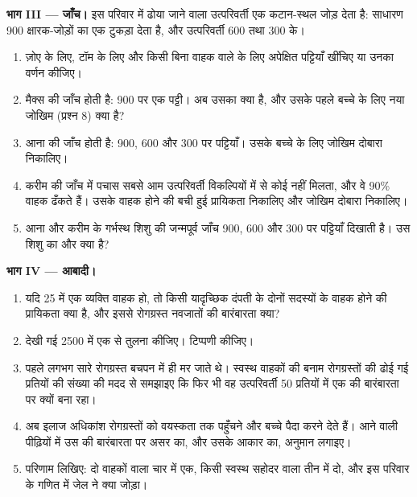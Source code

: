 \begin{problem}
\medskip
\noindent\textbf{भाग III --- जाँच।}
इस परिवार में ढोया जाने वाला उत्परिवर्ती  एक कटान-स्थल जोड़ देता है:
साधारण  900 क्षारक-जोड़ों का एक टुकड़ा देता है, और उत्परिवर्ती 600
तथा 300 के।
\begin{enumerate}[resume]
  \item ज़ोए के लिए, टॉम के लिए और किसी बिना वाहक वाले के लिए अपेक्षित
        पट्टियाँ खींचिए या उनका वर्णन कीजिए।
  \item मैक्स की जाँच होती है: 900 पर एक पट्टी। अब उसका  क्या है,
        और उसके पहले बच्चे के लिए नया जोखिम (प्रश्न 8) क्या है?
  \item आना की जाँच होती है: 900, 600 और 300 पर पट्टियाँ। उसके बच्चे के
        लिए जोखिम दोबारा निकालिए।
  \item करीम की जाँच में पचास सबसे आम उत्परिवर्ती विकल्पियों में से कोई
        नहीं मिलता, और वे 90\% वाहक ढँकते हैं। उसके वाहक होने की बची हुई
        प्रायिकता निकालिए और जोखिम दोबारा निकालिए।
  \item आना और करीम के गर्भस्थ शिशु की जन्मपूर्व जाँच 900, 600 और 300 पर
        पट्टियाँ दिखाती है। उस शिशु का  और  क्या है?
\end{enumerate}

\medskip
\noindent\textbf{भाग IV --- आबादी।}
\begin{enumerate}[resume]
  \item यदि 25 में एक व्यक्ति वाहक हो, तो किसी यादृच्छिक दंपती के दोनों
        सदस्यों के वाहक होने की प्रायिकता क्या है, और इससे रोगग्रस्त
        नवजातों की बारंबारता क्या?
  \item देखी गई 2500 में एक से तुलना कीजिए। टिप्पणी कीजिए।
  \item पहले लगभग सारे रोगग्रस्त बचपन में ही मर जाते थे। स्वस्थ वाहकों की
        बनाम रोगग्रस्तों की ढोई गई प्रतियों की संख्या की मदद से समझाइए कि
        फिर भी वह उत्परिवर्ती  50 प्रतियों में एक की बारंबारता पर
        क्यों बना रहा।
  \item अब इलाज अधिकांश रोगग्रस्तों को वयस्कता तक पहुँचने और बच्चे पैदा
        करने देते हैं। आने वाली पीढ़ियों में उस  की बारंबारता पर असर
        का, और उसके आकार का, अनुमान लगाइए।
  \item परिणाम लिखिए: दो वाहकों वाला चार में एक, किसी स्वस्थ सहोदर वाला
        तीन में दो, और इस परिवार के गणित में जेल ने क्या जोड़ा।
\end{enumerate}
\end{problem}

